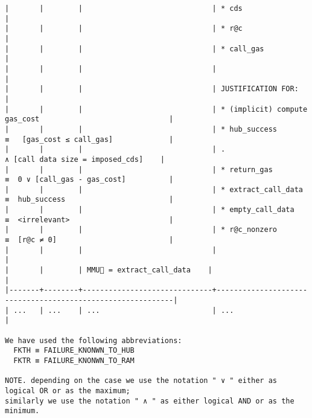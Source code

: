 \documentclass[varwidth=\maxdimen,margin=0.5cm,multi={verbatim}]{standalone}
\begin{document}
\begin{verbatim}
|       |        |                              | * cds                                                      |
|       |        |                              | * r@c                                                      |
|       |        |                              | * call_gas                                                 |
|       |        |                              |                                                            |
|       |        |                              | JUSTIFICATION FOR:                                         |
|       |        |                              | * (implicit) compute gas_cost                              |
|       |        |                              | * hub_success        ≡   [gas_cost ≤ call_gas]             |
|       |        |                              | .                      ∧ [call data size = imposed_cds]    |
|       |        |                              | * return_gas         ≡  0 ∨ [call_gas - gas_cost]          |
|       |        |                              | * extract_call_data  ≡  hub_success                        |
|       |        |                              | * empty_call_data    ≡  <irrelevant>                       |
|       |        |                              | * r@c_nonzero        ≡  [r@c ≠ 0]                          |
|       |        |                              |                                                            |
|       |        | MMU🏴 = extract_call_data    |                                                            |
|-------+--------+------------------------------+------------------------------------------------------------|
| ...   | ...    | ...                          | ...                                                        |

We have used the following abbreviations:
  FKTH ≡ FAILURE_KNONWN_TO_HUB
  FKTR ≡ FAILURE_KNONWN_TO_RAM

NOTE. depending on the case we use the notation " ∨ " either as logical OR or as the maximum;
similarly we use the notation " ∧ " as either logical AND or as the minimum.
\end{verbatim}
\end{document}
